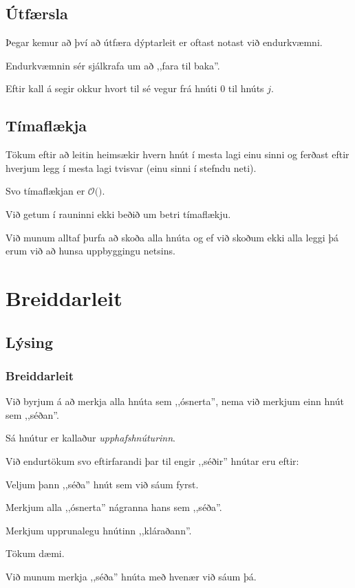 \subsection{Útfærsla}
{
    {
        \item<1-> Þegar kemur að því að útfæra dýptarleit er oftast notast við endurkvæmni.
        \item<2-> Endurkvæmnin sér sjálkrafa um að ,,fara til baka''.
        \item<3->[] 
        \item<4-> Eftir kall á  segir  okkur hvort til sé vegur frá hnúti $0$ til hnúts $j$.
    }
}

\subsection{Tímaflækja}
{
    {
        \item<1-> Tökum eftir að leitin heimsækir hvern hnút í mesta lagi einu sinni og
                    ferðast eftir hverjum legg í mesta lagi tvisvar (einu sinni í stefndu neti).
        \item<2-> Svo tímaflækjan er $\mathcal{O}($$)$.
        \item<4-> Við getum í rauninni ekki beðið um betri tímaflækju.
        \item<5-> Við munum alltaf þurfa að skoða alla hnúta og ef við skoðum ekki alla leggi þá erum við að hunsa uppbyggingu netsins.
    }
}

\section{Breiddarleit}
\subsection{Lýsing}
{
    \frametitle{Breiddarleit}
    {
        \item<1-> Við byrjum á að merkja alla hnúta sem ,,ósnerta'', nema við merkjum einn hnút sem ,,séðan''.
        \item<2-> Sá hnútur er kallaður \emph{upphafshnúturinn}.
        \item<3-> Við endurtökum svo eftirfarandi þar til engir ,,séðir'' hnútar eru eftir:
        {
            \item<4-> Veljum þann ,,séða'' hnút sem við sáum fyrst.
            \item<5-> Merkjum alla ,,ósnerta'' nágranna hans sem ,,séða''.
            \item<6-> Merkjum upprunalegu hnútinn ,,kláraðann''.
        }
        \item<7-> Tökum dæmi.
        \item<8-> Við munum merkja ,,séða'' hnúta með hvenær við sáum þá.
    }
}

